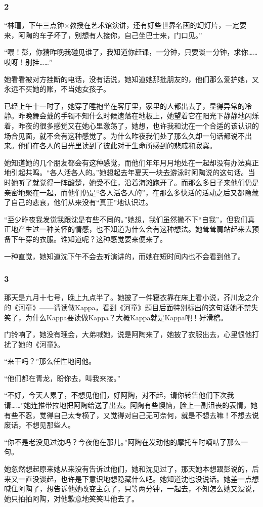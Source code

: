 \subsubsection*{2}
\par “林珊，下午三点钟×教授在艺术馆演讲，还有好些世界名画的幻灯片，一定要来，阿陶的车子坏了，别想有人接你，自己坐巴士来，门口见。”
\par “喂！彭，你猜昨晚我碰见谁了，我知道你赶课，一分钟，只要谈一分钟，求你……哎呀！别挂……”
\par 她看看被对方挂断的电话，没有话说，她知道她那批朋友的，他们那么爱护她，又永远不买她的账，不当她女孩子。
\par 已经上午十一时了，她穿了睡袍坐在客厅里，家里的人都出去了，显得异常的冷静。昨晚舞会戴的手镯不知什么时候遗落在地板上，她望着它在阳光下静静地闪烁着，昨夜的很多感觉又在她心里激荡了，她想，也许我和沈在一个合适的该认识的场合见面，就不会有这种感觉了。为什么昨夜我们处了那么久却一句话都说不出来。他们在各人的目光里读到了彼此对于生命所感到的悲戚和寂寞。
\par 她知道她的几个朋友都会有这种感觉，而他们年年月月地处在一起却没有办法真正地引起共鸣。“各人活各人的。”她想起去年夏天一块去游泳时阿陶说的这句话。当时她听了就觉得一阵酸楚，她受不住，沿着海滩跑开了。而那么多日子来他们仍是亲密地聚在一起，而他们仍是“各人活各人的”，在那么多快活的活动之后又都隐藏了自己的悲哀，他们从来没有“真正”地认识过。
\par “至少昨夜我发觉我跟沈是有些不同的。”她想，我们虽然撇不下“自我”，但我们真正地产生过一种关怀的情感，也不知道为什么会有这种想法。她耸耸肩站起来去预备下午穿的衣服。谁知道呢？这种感觉要来便来了。
\par 一种直觉，她知道沈下午不会去听演讲的，而她在短时间内也不会看到他了。
\subsubsection*{3}
\par 那天是九月十七号，晚上九点半了。她披了一件寝衣靠在床上看小说，芥川龙之介的《河童》——请读做Kappa，看到《河童》题目后面特别标出的这句话她不禁失笑了，为什么Kappa要读做Kappa？大概Kappa就是Kappa吧！好滑稽。
\par 门铃响了，她没有理会，大弟喊她，说是阿陶来了，她披了衣服出去，心里恨他打扰了她的《河童》。
\par “来干吗？”那么任性地问他。
\par “他们都在青龙，盼你去，叫我来接。”
\par “不好，今天人累了，不想见他们，好阿陶，对不起，请你转告他们下次我请……”她连推带拉地把阿陶给送了出去。阿陶有些懊恼，脸上一副沮丧的表情，她有些不忍，觉得自己太专横了，又觉得对自己无可奈何，就是不想去嘛！不想去说废话，不想见那些人。
\par “你不是老没见过沈吗？今夜他在那儿。”阿陶在发动他的摩托车时嘀咕了那么一句。
\par 她忽然想起原来她从来没有告诉过他们，她和沈见过了，那天她本想跟彭说的，后来又一直没谈起，也许是下意识地想隐藏什么吧。她知道沈也没说话。她差一点想喊住阿陶了，想告诉他她改变主意了，只等两分钟，一起去，不知怎么她又没说，她只拍拍阿陶，对他歉意地笑笑叫他去了。
